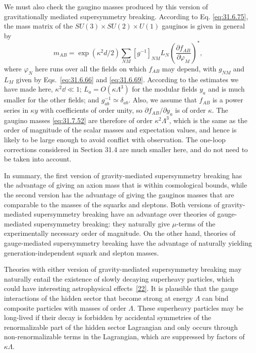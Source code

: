 We must also check the gaugino masses produced by this version of
gravitationally mediated supersymmetry breaking. According to Eq.
\eqref{eq:31.6.75}, the mass matrix of the
\(SU(3)\times SU(2)\times U(1)\) gauginos is given in general by
\begin{equation}
  m_{AB}
  =\exp(\kappa^2d/2)\sum_{NM}[g^{-1}]_{NM}L_N
    \left(\frac{\partial f_{AB}}{\partial\varphi_M}\right)^*,
  \tag{31.7.52}\label{eq:31.7.52}
\end{equation}
where \(\varphi_N\) here runs over all the fields on which \(f_{AB}\) may
depend, with \(g_{NM}\) and \(L_M\) given by Eqs.~\eqref{eq:31.6.66} and
\eqref{eq:31.6.69}. According to the estimates we have made here,
\(\kappa^2\dd\ll1\); \(L_a=O(\kappa\Lambda^3)\) for the modular fields \(y_a\)
and is much smaller for the other fields; and \(g_{ab}^{-1}\simeq
\delta_{ab}\). Also, we assume that \(f_{AB}\) is a power series in
\(\kappa y\) with coefficients of order unity, so
\(\partial f_{AB}/\partial y_a\) is of order \(\kappa\). The gaugino masses
\eqref{eq:31.7.52} are therefore of order \(\kappa^2\Lambda^3\), which is
the same as the order of magnitude of the scalar masses and expectation
values, and hence is likely to be large enough to avoid conflict with
observation. The one-loop corrections considered in Section 31.4 are much
smaller here, and do not need to be taken into account.

In summary, the first version of gravity-mediated supersymmetry breaking has
the advantage of giving an axion mass that is within cosmological bounds,
while the second version has the advantage of giving the gauginos masses
that are comparable to the masses of the squarks and sleptons. Both
versions of gravity-mediated supersymmetry breaking have an advantage over
theories of gauge-mediated supersymmetry breaking: they naturally give
\(\mu\)-terms of the experimentally necessary order of magnitude. On the
other hand, theories of gauge-mediated supersymmetry breaking have the
advantage of naturally yielding generation-independent squark and slepton
masses.

Theories with either version of gravity-mediated supersymmetry breaking may
naturally entail the existence of slowly decaying superheavy particles,
which could have interesting astrophysical
effects~\hyperref[ch31-ref-22]{[22]}. It is plausible that the gauge
interactions of the hidden sector that become strong at energy \(\Lambda\)
can bind composite particles with masses of order \(\Lambda\). These
superheavy particles may be long-lived if their decay is forbidden by
accidental symmetries of the renormalizable part of the hidden sector
Lagrangian and only occurs through non-renormalizable terms in the
Lagrangian, which are suppressed by factors of \(\kappa\Lambda\).
